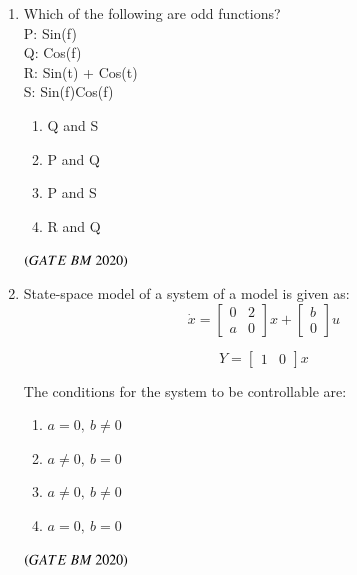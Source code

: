 \documentclass[journal,12pt,onecolumn]{IEEEtran}
\theoremstyle{remark}
\begin{document}
\begin{enumerate}
\item Which of the following are odd functions?\\
P: Sin(f)\\
Q: Cos(f)\\
R: Sin(t) + Cos(t)\\
S: Sin(f)Cos(f)\\
\begin{enumerate}[label=\alph*)] 
\item\hspace{0.5cm}Q and S
\item\hspace{0.5cm}P and Q
\item\hspace{0.5cm}P and S
\item\hspace{0.5cm}R and Q
\end{enumerate}
 \hfill $\left(GATE\ BM\ 2020\right)$\\
 
\item State-space model of a system of a model is given as:
\[
\dot{x} = \begin{bmatrix} 0 & 2 \\ a & 0 \end{bmatrix} x + \begin{bmatrix} b \\ 0 \end{bmatrix} u
\]

\[
Y = \begin{bmatrix} 1 & 0 \end{bmatrix} x
\]

The conditions for the system to be controllable are:

\begin{enumerate}[label=(\Alph*)]
    \item\hspace{0.5cm} $a = 0,\ b \ne 0$
    \item\hspace{0.5cm} $a \ne 0,\ b = 0$
    \item\hspace{0.5cm} $a \ne 0,\ b \ne 0$
    \item\hspace{0.5cm} $a = 0,\ b = 0$
\end{enumerate}
 \hfill $\left(GATE\ BM\ 2020\right)$\\
 

\end{enumerate}
\end{document}
